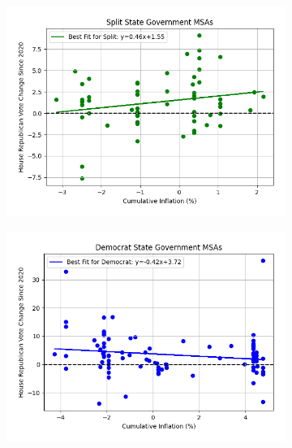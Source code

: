\documentclass{article}
\begin{document}
\begin{figure}[ht]
\centering
\begin{subfigure}[b]{0.4\textwidth}
    \centering
    \includegraphics[width=\textwidth]{house_goods_Split_msa_swing_scatter.png}
\end{subfigure}
\begin{subfigure}[b]{0.4\textwidth}
    \centering
    \includegraphics[width=\textwidth]{house_goods_D_msa_swing_scatter.png}
\end{subfigure}


\end{figure}
\end{document}
